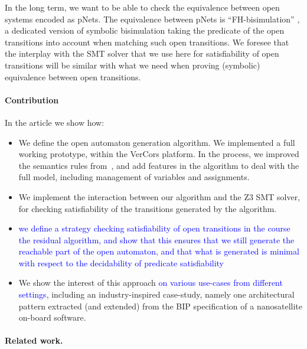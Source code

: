 \documentclass[smallcondensed]{svjour3}
\newcommand{\TODO}[1]{\textcolor{red}{\textbf{[TODO:#1]}}}
\newcommand{\ERIC}[1]{\textcolor{blue}{#1}}
\begin{document}
In the long term, we want to be able to check the equivalence between
open systems encoded as pNets. The equivalence between pNets is
``FH-bisimulation'' \cite{henrio:Forte2016}, a dedicated version of
symbolic bisimulation taking the  
predicate of the open transitions into account when matching such
open transitions. We foresee that the interplay with the SMT solver
that we use here for satisfiability of open transitions will be
similar with what we need when proving (symbolic) equivalence between open
transitions. 

\paragraph{Contribution}
In the article we show how:
\begin{itemize}
\item We define the open automaton generation algorithm. We
  implemented a full working prototype, within the 
  VerCors platform. In the process, we improved the
  semantics rules from~\cite{henrio:Forte2016}, and add features in
  the algorithm to deal with the full 
  model, including management of variables and assignments.
\item We implement the interaction between our algorithm and the Z3
    SMT solver, for checking satisfiability of the transitions
    generated by the algorithm.
    \item \ERIC{we define a strategy checking satisfiability of open transitions in the course the residual algorithm, and show that this ensures that we still generate the reachable part of the open automaton, and that what is generated is minimal with respect to the decidability of predicate satisfiability} 
\item We show the interest of this approach \ERIC{on various use-cases from different settings}, including an
    industry-inspired case-study, namely one architectural pattern
    extracted (and extended) from the BIP specification of a nanosatellite on-board
    software.
\end{itemize}





\paragraph{Related work.}

\end{document}
